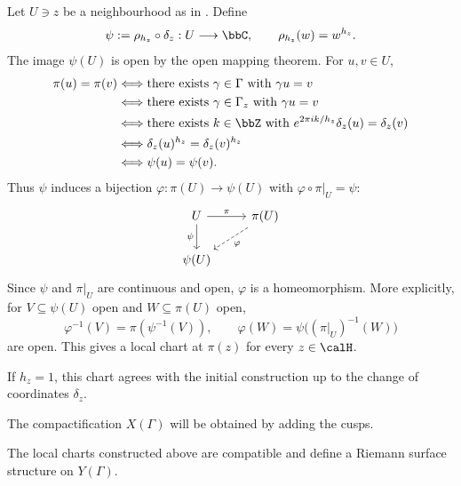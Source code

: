 Let $U \ni z$ be a neighbourhood as in . Define
\[
    \psi := \rho_{h_z} \circ \delta_z : U \longrightarrow \bbC, \qquad \rho_{h_z}(w) = w^{h_z}.
\]
The image $\psi(U)$ is open by the open mapping theorem. For $u, v \in U$,
\[
    \begin{aligned}
        \pi(u) = \pi(v) &\Longleftrightarrow \text{there exists } \gamma \in \Gamma \text{ with } \gamma u = v\\
        &\Longleftrightarrow \text{there exists } \gamma \in \Gamma_z \text{ with } \gamma u = v\\
        &\Longleftrightarrow \text{there exists } k \in \bbZ \text{ with } e^{2\pi i k/h_z}\delta_z(u) = \delta_z(v)\\
        &\Longleftrightarrow \delta_z(u)^{h_z} = \delta_z(v)^{h_z}\\
        &\Longleftrightarrow \psi(u) = \psi(v).
    \end{aligned}
\]
Thus $\psi$ induces a bijection $\varphi : \pi(U) \to \psi(U)$ with $\varphi \circ \pi|_U = \psi$:
\[
    \begin{tikzcd}
        U \arrow[r, "\pi"] \arrow[d, "\psi"'] & \pi(U) \arrow[dl, dashed, "\varphi"]\\
        \psi(U) &
    \end{tikzcd}
\]
Since $\psi$ and $\pi|_U$ are continuous and open, $\varphi$ is a homeomorphism. More explicitly, for $V \subseteq \psi(U)$ open and $W \subseteq \pi(U)$ open,
\[
    \varphi^{-1}(V) = \pi(\psi^{-1}(V)), \qquad \varphi(W) = \psi\bigl((\pi|_U)^{-1}(W)\bigr)
\]
are open. This gives a local chart at $\pi(z)$ for every $z \in \calH$.

\begin{remark}
    If $h_z = 1$, this chart agrees with the initial construction up to the change of coordinates $\delta_z$.
\end{remark}

\begin{remarkstar}
    The compactification $X(\Gamma)$ will be obtained by adding the cusps.
\end{remarkstar}

\begin{proposition}\label{Prop:MF_chart_compatibility}
    The local charts constructed above are compatible and define a Riemann surface structure on $Y(\Gamma)$.
\end{proposition}

